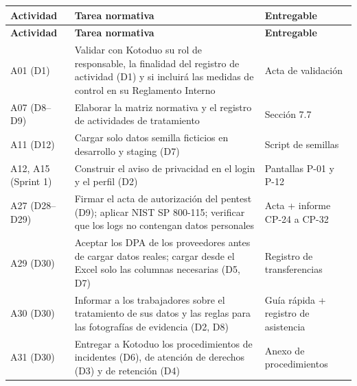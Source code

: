 \documentclass[11pt,a4paper]{article}
\begin{document}
\begingroup
\begin{longtable}{@{}>{\raggedright\arraybackslash\hspace{0pt}}p{}>{\raggedright\arraybackslash\hspace{0pt}}p{}>{\raggedright\arraybackslash\hspace{0pt}}p{}@{}}
\toprule
\textbf{Actividad} & \textbf{Tarea normativa} & \textbf{Entregable} \\ \midrule
\endfirsthead
\toprule
\textbf{Actividad} & \textbf{Tarea normativa} & \textbf{Entregable} \\ \midrule
\endhead
\bottomrule
\endlastfoot
A01 (D1) & Validar con Kotoduo su rol de responsable, la finalidad del registro de actividad (D1) y si incluirá las medidas de control en su Reglamento Interno & Acta de validación \\ \addlinespace[0.25em]
A07 (D8--D9) & Elaborar la matriz normativa y el registro de actividades de tratamiento & Sección 7.7 \\ \addlinespace[0.25em]
A11 (D12) & Cargar solo datos semilla ficticios en desarrollo y staging (D7) & Script de semillas \\ \addlinespace[0.25em]
A12, A15 (Sprint 1) & Construir el aviso de privacidad en el login y el perfil (D2) & Pantallas \mbox{P-01} y \mbox{P-12} \\ \addlinespace[0.25em]
A27 (D28--D29) & Firmar el acta de autorización del pentest (D9); aplicar NIST SP 800-115; verificar que los logs no contengan datos personales & Acta + informe \mbox{CP-24} a \mbox{CP-32} \\ \addlinespace[0.25em]
A29 (D30) & Aceptar los DPA de los proveedores antes de cargar datos reales; cargar desde el Excel solo las columnas necesarias (D5, D7) & Registro de transferencias \\ \addlinespace[0.25em]
A30 (D30) & Informar a los trabajadores sobre el tratamiento de sus datos y las reglas para las fotografías de evidencia (D2, D8) & Guía rápida + registro de asistencia \\ \addlinespace[0.25em]
A31 (D30) & Entregar a Kotoduo los procedimientos de incidentes (D6), de atención de derechos (D3) y de retención (D4) & Anexo de procedimientos \\
\end{longtable}
\endgroup
\end{document}
